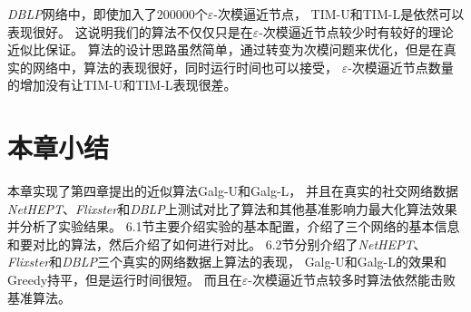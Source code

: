 {\em DBLP}网络中，即使加入了$200000$个$\varepsilon$-次模逼近节点，
{\sf TIM-U}和{\sf TIM-L}是依然可以表现很好。
这说明我们的算法不仅仅只是在$\varepsilon$-次模逼近节点较少时有较好的理论近似比保证。
算法的设计思路虽然简单，通过转变为次模问题来优化，但是在真实的网络中，算法的表现很好，同时运行时间也可以接受，
$\varepsilon$-次模逼近节点数量的增加没有让{\sf TIM-U}和{\sf TIM-L}表现很差。


\section{本章小结}
本章实现了第四章提出的近似算法\textsf{Galg-U}和\textsf{Galg-L}，
并且在真实的社交网络数据{\em NetHEPT}、{\em Flixster}和{\em DBLP}上测试对比了算法和其他基准影响力最大化算法效果并分析了实验结果。
6.1节主要介绍实验的基本配置，介绍了三个网络的基本信息和要对比的算法，然后介绍了如何进行对比。
6.2节分别介绍了{\em NetHEPT}、{\em Flixster}和{\em DBLP}三个真实的网络数据上算法的表现，
\textsf{Galg-U}和\textsf{Galg-L}的效果和\textsf{Greedy}持平，但是运行时间很短。
而且在$\varepsilon$-次模逼近节点较多时算法依然能击败基准算法。





